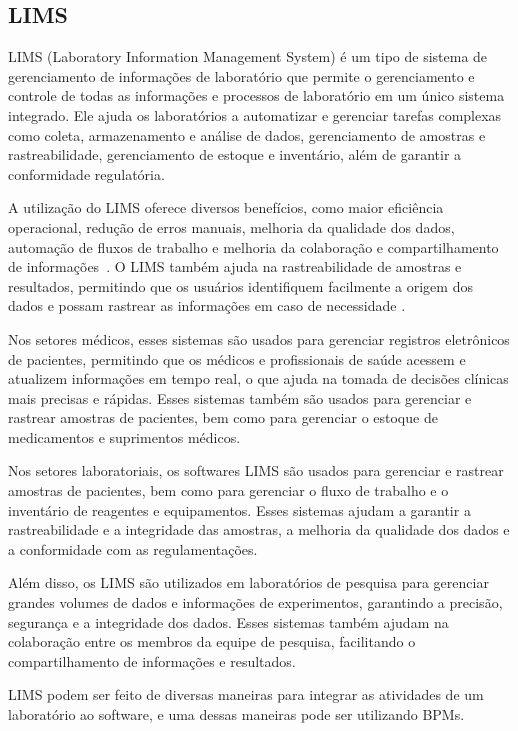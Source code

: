 \subsection{LIMS}


LIMS (Laboratory Information Management System) é um tipo de sistema de gerenciamento de informações de laboratório que permite o gerenciamento e controle de todas as informações e processos de laboratório em um único sistema integrado. Ele ajuda os laboratórios a automatizar e gerenciar tarefas complexas como coleta, armazenamento e análise de dados, gerenciamento de amostras e rastreabilidade, gerenciamento de estoque e inventário, além de garantir a conformidade regulatória.


A utilização do LIMS oferece diversos benefícios, como maior eficiência operacional, redução de erros manuais, melhoria da qualidade dos dados, automação de fluxos de trabalho e melhoria da colaboração e compartilhamento de informações~\cite{Key2011LIMS:Systems}. O LIMS também ajuda na rastreabilidade de amostras e resultados, permitindo que os usuários identifiquem facilmente a origem dos dados e possam rastrear as informações em caso de necessidade \R.


Nos setores médicos, esses sistemas são usados para gerenciar registros eletrônicos de pacientes, permitindo que os médicos e profissionais de saúde acessem e atualizem informações em tempo real, o que ajuda na tomada de decisões clínicas mais precisas e rápidas. Esses sistemas também são usados para gerenciar e rastrear amostras de pacientes, bem como para gerenciar o estoque de medicamentos e suprimentos médicos.

Nos setores laboratoriais, os softwares LIMS são usados para gerenciar e rastrear amostras de pacientes, bem como para gerenciar o fluxo de trabalho e o inventário de reagentes e equipamentos. Esses sistemas ajudam a garantir a rastreabilidade e a integridade das amostras, a melhoria da qualidade dos dados e a conformidade com as regulamentações.

Além disso, os LIMS são utilizados em laboratórios de pesquisa para gerenciar grandes volumes de dados e informações de experimentos, garantindo a precisão, segurança e a integridade dos dados. Esses sistemas também ajudam na colaboração entre os membros da equipe de pesquisa, facilitando o compartilhamento de informações e resultados.

LIMS podem ser feito de diversas maneiras para integrar as atividades de um laboratório ao software, e uma dessas maneiras pode ser utilizando BPMs.


